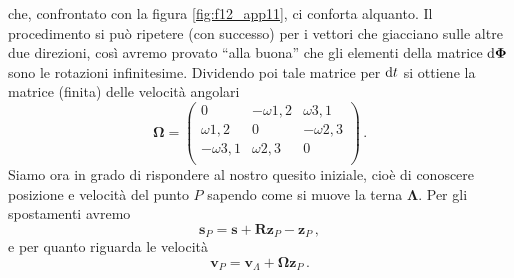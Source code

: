 \vskip 2mm
\noindent che, confrontato con la figura \ref{fig:f12_app11}, ci conforta alquanto.
Il procedimento si pu\`o ripetere (con successo) per i vettori che giacciano
sulle altre due direzioni, cos\`i avremo provato ``alla buona'' che
gli elementi della matrice
${\rm d}\bm \Phi$ sono le rotazioni infinitesime.
Dividendo poi tale matrice per ${\rm d}t$ si ottiene la matrice (finita) delle
velocit\`a angolari
\begin{equation}
{\bm\Omega}=\left( \begin{array}{ccc}
0 & -\omega{{\scriptscriptstyle{1,2}}} & \omega{{\scriptscriptstyle{3,1}}}\\
\omega{{\scriptscriptstyle{1,2}}} & 0 & -\omega{{\scriptscriptstyle{2,3}}}\\
-\omega{{\scriptscriptstyle{3,1}}} & \omega{{\scriptscriptstyle{2,3}}} & 0\\
\end{array}
\right)
\,.
\label{e113_app11}
\end{equation}
\noindent Siamo ora in grado di rispondere al nostro quesito iniziale, cio\`e di conoscere
posizione e velocit\`a del punto $P$
sapendo come si muove la terna $\bm \Lambda$. Per gli spostamenti avremo
\begin{equation}
{\bm s}_{\scriptscriptstyle{P}}=
{{\bm s}}+
{\bm R}{\bm z}_{\scriptscriptstyle{P}}-
{\bm z}_{\scriptscriptstyle{P}}\,,
\label{e114_app11}
\end{equation}
\noindent e per quanto riguarda le velocit\`a
\begin{equation}
{\bm v}_{\scriptscriptstyle{P}}=
{\bm v}_{\scriptscriptstyle\Lambda}+
{\bm \Omega}{\bm z}_{\scriptscriptstyle{P}}\,.
\label{e115_app11}
\end{equation}

